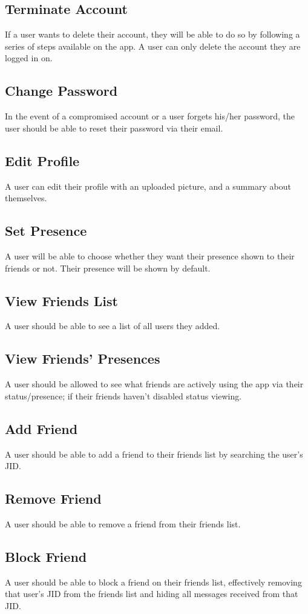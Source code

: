\documentclass[11pt]{article}
\theoremstyle{plain}
\theoremstyle{definition}
\begin{document}
\subsection{Terminate Account}
If a user wants to delete their account, they will be able to do so by following a series of steps available on the app. A user can only delete the account they are logged in on.
\subsection{Change Password}
In the event of a compromised account or a user forgets his/her password, the user should be able to reset their password via their email.
\subsection{Edit Profile}
A user can edit their profile with an uploaded picture, and a summary about themselves.
\subsection{Set Presence}
A user will be able to choose whether they want their presence shown to their friends or not. Their presence will be shown by default.
\subsection{View Friends List}
A user should be able to see a list of all users they added.
\subsection{View Friends' Presences}
A user should be allowed to see what friends are actively using the app via their status/presence; if their friends haven't disabled status viewing.
\subsection{Add Friend}
A user should be able to add a friend to their friends list by searching the user's JID.
\subsection{Remove Friend}
A user should be able to remove a friend from their friends list.
\subsection{Block Friend}
A user should be able to block a friend on their friends list, effectively removing that user's JID from the friends list and hiding all messages received from that JID.
\end{document}
